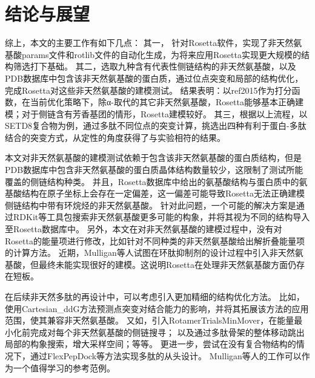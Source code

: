 
\chapter{结论与展望}


综上，本文的主要工作有如下几点：
其一， 针对Rosetta软件，实现了非天然氨基酸params文件和rotlib文件的自动化生成，为将来应用Rosetta实现更大规模的结构筛选打下基础。
其二，选取九种含有代表性侧链结构的非天然氨基酸，以及PDB数据库中包含该非天然氨基酸的蛋白质，通过位点突变和局部的结构优化，完成Rosetta对这些非天然氨基酸的建模测试。
结果表明：以ref2015作为打分函数，在当前优化策略下，除α-取代的其它非天然氨基酸，Rosetta能够基本正确建模；对于侧链含有芳香基团的情形，Rosetta建模较好。
其三，根据以上流程，以SETD8复合物为例，通过多肽不同位点的突变计算，挑选出四种有利于蛋白-多肽结合的突变方式，从定性的角度获得了与实验相符的结果。

本文对非天然氨基酸的建模测试依赖于包含该非天然氨基酸的蛋白质结构，但是PDB数据库中包含非天然氨基酸的蛋白质晶体结构数量较少，这限制了测试所能覆盖的侧链结构种类。
并且，Rosetta数据库中给出的氨基酸结构与蛋白质中的氨基酸结构在原子坐标上会存在一定偏差，这一偏差可能导致Rosetta无法正确建模侧链结构中带有环烷烃的非天然氨基酸。
针对此问题，一个可能的解决方案是通过RDKit等工具包搜索非天然氨基酸更多可能的构象，并将其视为不同的结构导入至Rosetta数据库中。
另外，本文在对非天然氨基酸的建模过程中，没有对Rosetta的能量项进行修改，比如针对不同种类的非天然氨基酸给出解折叠能量项的计算方法。
近期，Mulligan等人试图在环肽抑制剂的设计过程中引入非天然氨基酸，但最终未能实现很好的建模。这说明Rosetta在处理非天然氨基酸方面仍存在短板。

在后续非天然多肽的再设计中，可以考虑引入更加精细的结构优化方法。
比如，使用Cartesian\_ddG方法预测点突变对结合能力的影响，并将其拓展该方法的应用范围，使其兼容非天然氨基酸。
又如，引入RotamerTrialsMinMover，在能量最小化前完成对每个非天然氨基酸的侧链搜寻；
以及通过多肽骨架的整体移动跳出局部的构象搜索，增大采样空间；等等。
更进一步，尝试在没有复合物结构的情况下，通过FlexPepDock等方法实现多肽的从头设计。
Mulligan等人的工作可以作为一个值得学习的参考范例。
